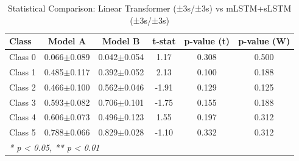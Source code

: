 \begin{table}[htbp]
\centering
\caption{Statistical Comparison: Linear Transformer (±3s/±3s) vs mLSTM+sLSTM (±3s/±3s)}
\label{tab:comparison_class_linear_transformer_±3s_±3s_vs_mlstmslstm_±3s_±3s}
\begin{tabular}{lccccc}
\toprule
\textbf{Class} & \textbf{Model A} & \textbf{Model B} & \textbf{t-stat} & \textbf{p-value (t)} & \textbf{p-value (W)} \\
\midrule
Class 0 & 0.066$\pm$0.089 & 0.042$\pm$0.054 & 1.17 & 0.308 & 0.500 \\
Class 1 & 0.485$\pm$0.117 & 0.392$\pm$0.052 & 2.13 & 0.100 & 0.188 \\
Class 2 & 0.466$\pm$0.100 & 0.562$\pm$0.046 & -1.91 & 0.129 & 0.125 \\
Class 3 & 0.593$\pm$0.082 & 0.706$\pm$0.101 & -1.75 & 0.155 & 0.188 \\
Class 4 & 0.606$\pm$0.073 & 0.496$\pm$0.123 & 1.55 & 0.197 & 0.312 \\
Class 5 & 0.788$\pm$0.066 & 0.829$\pm$0.028 & -1.10 & 0.332 & 0.312 \\
\bottomrule
\multicolumn{6}{l}{\textit{* p < 0.05, ** p < 0.01}} \\
\end{tabular}
\end{table}